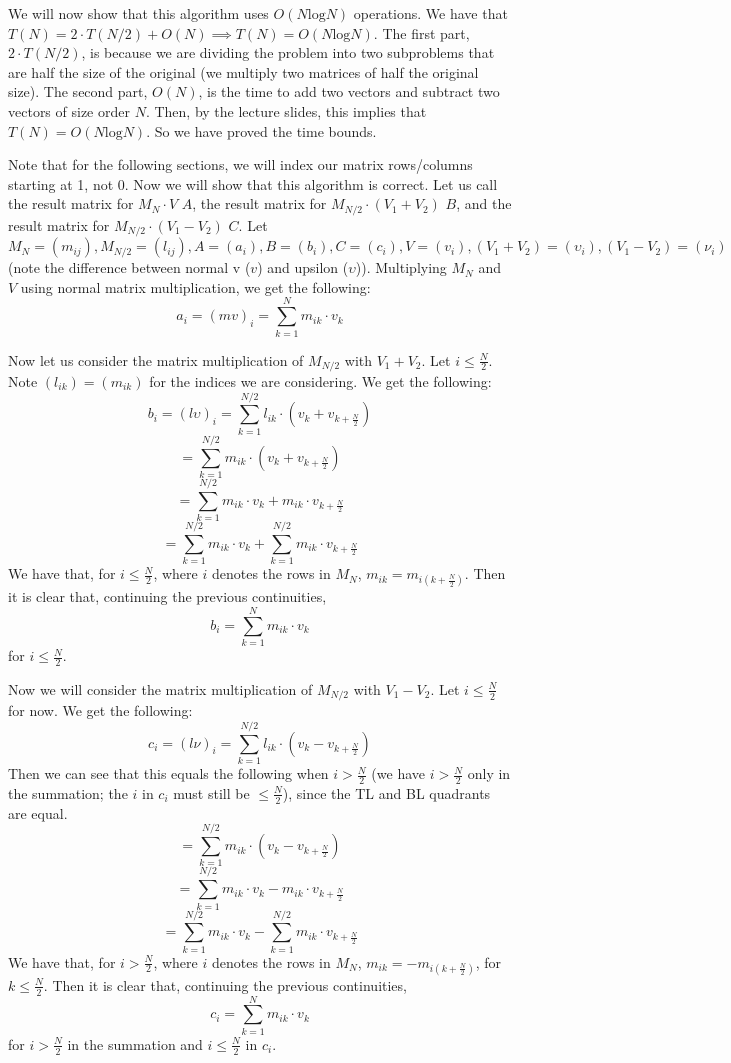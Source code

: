 \documentclass{article}
\begin{document}
We will now show that this algorithm uses $O(N\text{log}N)$ operations. We have
that $T(N) = 2 \cdot T(N/2) + O(N) \implies T(N) = O(N\text{log}N)$. The first
part, $2 \cdot T(N/2)$, is because we are dividing the problem into two subproblems that are half
the size of the original (we multiply two matrices of half the original size).
The second part, $O(N)$, is the time to add two
vectors and subtract two vectors of size order $N$. Then, by the lecture slides,
this implies that $T(N) = O(N\text{log}N)$. So we have proved the time bounds.

Note that for the following sections, we will index our matrix rows/columns starting
at 1, not 0. Now we will show that this algorithm is correct. Let us call the result
matrix for $M_N \cdot V$ $A$, the result matrix for $M_{N/2} \cdot (V_1 + V_2)$
$B$, and the result matrix for $M_{N/2} \cdot (V_1 - V_2)$ $C$. Let $M_N = (m_{ij}), M_{N/2} =
(l_{ij}), A = (a_i), B = (b_i), C = (c_i), V = (v_i), (V_1 + V_2) = (\upsilon_i),
(V_1 - V_2) = (\nu_i)$ (note the difference between normal v ($v$) and upsilon
($\upsilon$)). Multiplying $M_N$ and $V$ using normal matrix
multiplication, we get the following:
\[ a_i = (mv)_i = \sum_{k=1}^N m_{ik} \cdot v_{k} \]

\vspace{5mm}
Now let us consider the matrix multiplication of $M_{N/2}$ with $V_1 + V_2$.
Let $i \leq \frac{N}{2}$. Note $(l_{ik}) = (m_{ik})$ for the indices we
are considering. We get the following:
\[ b_i = (l\upsilon)_i = \sum_{k=1}^{N/2} l_{ik} \cdot (v_k + v_{k +
\frac{N}{2}})\]
\[ = \sum_{k=1}^{N/2} m_{ik} \cdot (v_k + v_{k + \frac{N}{2}})\]
\[ = \sum_{k=1}^{N/2} m_{ik} \cdot v_k + m_{ik} \cdot v_{k + \frac{N}{2}}\]
\[ = \sum_{k=1}^{N/2} m_{ik} \cdot v_k + \sum_{k=1}^{N/2} m_{ik} \cdot v_{k + \frac{N}{2}}\]
We have that, for $i \leq \frac{N}{2}$, where $i$
denotes the rows in $M_N$, $m_{ik} = m_{i(k+\frac{N}{2})}$. Then it is clear
that, continuing the previous continuities,
\[ b_i = \sum_{k=1}^N m_{ik} \cdot v_k \]
for $i \leq \frac{N}{2}$.

\vspace{5mm}
Now we will consider the matrix multiplication of $M_{N/2}$ with $V_1 - V_2$.
Let $i \leq \frac{N}{2}$ for now.
We get the following:
\[ c_i = (l\nu)_i = \sum_{k=1}^{N/2} l_{ik} \cdot (v_k - v_{k +
\frac{N}{2}})\]
Then we can see that this equals the following when $i > \frac{N}{2}$ (we have
$i > \frac{N}{2}$ only in
the summation; the $i$ in $c_i$ must still be $\leq \frac{N}{2}$), since
the TL and BL quadrants are equal.
\[ = \sum_{k=1}^{N/2} m_{ik} \cdot (v_k - v_{k + \frac{N}{2}})\]
\[ = \sum_{k=1}^{N/2} m_{ik} \cdot v_k - m_{ik} \cdot v_{k + \frac{N}{2}}\]
\[ = \sum_{k=1}^{N/2} m_{ik} \cdot v_k - \sum_{k=1}^{N/2}
m_{ik} \cdot v_{k + \frac{N}{2}}\]
We have that, for $i > \frac{N}{2}$, where $i$ denotes the rows in $M_N$,
$m_{ik} = -m_{i(k+\frac{N}{2})}$, for $k \leq \frac{N}{2}$.
Then it is clear that, continuing the previous continuities,
\[ c_i = \sum_{k=1}^N m_{ik} \cdot v_k \]
for $i > \frac{N}{2}$ in the summation and $i \leq \frac{N}{2}$ in $c_i$.
\end{document}
